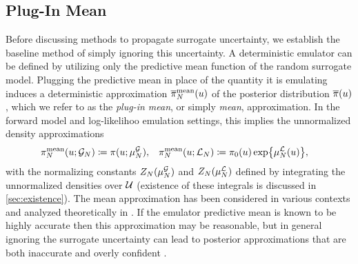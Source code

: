 \documentclass[12pt]{article}
\begin{document}
\subsection{Plug-In Mean}
Before discussing methods to propagate surrogate uncertainty, we establish the baseline method of simply 
ignoring this uncertainty. A deterministic emulator can be defined by utilizing only the predictive mean function
of the random surrogate model. Plugging the predictive mean in place of the quantity it is emulating induces 
a deterministic approximation $\postApproxNormMean[\Ndesign](\Par)$ of the posterior distribution 
$\postDensNorm(\Par)$, which we refer to as the \textit{plug-in mean}, or simply \textit{mean}, approximation. 
In the forward model and log-likelihoo emulation settings, this implies the unnormalized density approximations 
\begin{align}
&\postApproxMean[\Ndesign](\Par; \fwdEm[\Ndesign]) \Def \postDens(\Par; \emMean[\Ndesign]{\fwd}), \label{eq:mean-approx-fwd}
&&\postApproxMean[\Ndesign](\Par; \llikEm[\Ndesign]) \Def \priorDens(\Par) \Exp{\emMean[\Ndesign]{\llik}(\Par)}, \label{eq:mean-approx_llik}
\end{align}
with the normalizing constants $\normCstEm(\emMean[\Ndesign]{\fwd})$ and 
$\normCstEm(\emMean[\Ndesign]{\llik})$ defined by integrating the unnormalized densities over $\parSpace$
(existence of these integrals is discussed in \cref{sec:existence}).
The mean approximation has been considered in various contexts
\citep{VehtariParallelGP,trainDynamics,emPostDens,BurknerSurrogate,CLMBayesianCalibration} and analyzed
theoretically in 
\citep{StuartTeck1,StuartTeck2,random_fwd_models,TeckHyperpar,gp_surrogates_random_exploration}.
If the emulator predictive mean is known to be highly accurate then this approximation may be reasonable,
but in general ignoring the surrogate uncertainty can lead to posterior approximations that are 
both inaccurate and overly confident \citep{BurknerSurrogate}. 
\end{document}
